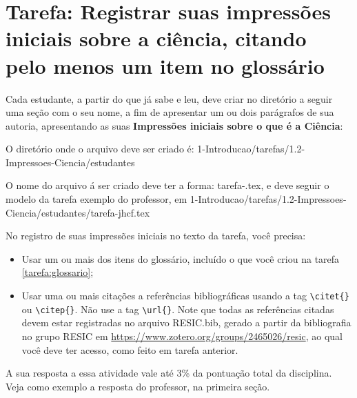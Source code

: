 \section{Tarefa: Registrar suas impressões iniciais sobre a ciência, citando pelo menos  um item no glossário}

Cada estudante, a partir do que já sabe e leu, deve criar no diretório a seguir uma seção com o seu nome, a fim de apresentar um ou dois parágrafos de sua autoria, apresentando as suas \textbf{Impressões iniciais sobre o que é a Ciência}: 

O diretório onde o arquivo deve ser criado é: 
1-Introducao/tarefas/1.2-Impressoes-Ciencia/estudantes

O nome do arquivo á ser criado deve ter a forma:
tarefa-\githubusername.tex, e deve seguir o modelo da tarefa exemplo do professor, em
1-Introducao/tarefas/1.2-Impressoes-Ciencia/estudantes/tarefa-jhcf.tex

No registro de suas impressões iniciais no texto da tarefa, você precisa:
\begin{itemize}
    \item Usar um ou mais dos itens do glossário, incluído o que você criou na tarefa \ref{tarefa:glossario};
    \item Usar uma ou mais citações a referências bibliográficas usando a tag \verb|\citet{}| ou \verb|\citep{}|. Não use a tag \verb|\url{}|. Note que todas as referências citadas devem estar registradas no arquivo RESIC.bib, gerado a partir da bibliografia no grupo RESIC em \url{https://www.zotero.org/groups/2465026/resic}, ao qual você deve ter acesso, como feito em tarefa anterior.
\end{itemize}

A sua resposta a essa atividade vale até 3\% da pontuação total da disciplina.
Veja como exemplo a resposta do professor, na primeira seção.

